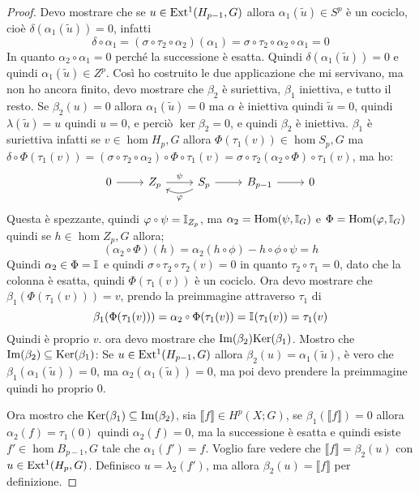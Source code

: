 \begin{proof}
  Devo mostrare che se $ u \in \mathrm{Ext^1}( H_{p-1},G) $ allora $ \alpha_1(\tilde{u}) \in S^p $
  è un cociclo, cioè $ \delta(\alpha_1(\tilde{u})) = 0 $, infatti
  \[
    \delta \circ \alpha_1 = (\sigma \circ \tau_2 \circ \alpha_2)(\alpha_1) = \sigma \circ \tau_2 \circ \alpha_2 \circ \alpha_1 = 0
  \]
  In quanto $ \alpha_2 \circ \alpha_1 = 0 $ perché la successione è esatta.
  Quindi $ \delta(\alpha_1(\tilde{u})) = 0 $ e quindi $ \alpha_1(\tilde{u}) \in Z^p $.
  Così ho costruito le due applicazione che mi servivano, ma non ho ancora
  finito, devo mostrare che $ \beta_2 $ è suriettiva, $ \beta_1 $ iniettiva, e tutto
  il resto.
  Se $ \beta_2(u) = 0 $ allora $ \alpha_1(\tilde{u}) = 0 $ ma $ \alpha $ è iniettiva quindi
  $ \tilde{u} = 0 $, quindi $ \lambda(\tilde{u}) = u $ quindi $ u = 0 $, e perciò
  $ \ker{\beta_2} = 0 $, e quindi $ \beta_2 $ è iniettiva.
  $ \beta_1 $ è suriettiva infatti se $ v \in \hom{H_p, G} $ allora $ \Phi(\tau_1(v)) \in \hom{S_p,G} $
  ma $ \delta \circ \Phi(\tau_1(v)) = (\sigma \circ \tau_2 \circ \alpha_2) \circ \Phi \circ \tau_1 (v) = \sigma \circ \tau_2 (\alpha_2 \circ \Phi) \circ \tau_1 (v) $,
  ma ho:
  \[
    \begin{tikzcd}
      0 \rar & Z_p \rar{\psi} & S_p \arrow[bend left]{l}{\phi} \rar & B_{p-1} \rar & 0
    \end{tikzcd}
  \]
  Questa è spezzante, quindi $ \phi \circ \psi = \Id{Z_p} $, ma
  $ \alpha_2 = \mathrm{Hom}( \psi, \mathbb{I}_{G}) $ e $ \Phi = \mathrm{Hom}( \varphi, \mathbb{I}_{G}) $
  quindi se $ h \in \hom{Z_p, G} $ allora;
  \[
    (\alpha_2 \circ \Phi)(h) = \alpha_2(h \circ \phi) - h \circ \phi \circ \psi = h
  \]
  Quindi $ \alpha_2 \in \Phi = \mathbb{I}_{} $ e quindi $ \sigma \circ \tau_2 \circ \tau_2 (v) = 0 $ in quanto
  $ \tau_2 \circ \tau_1 = 0 $, dato che la colonna è esatta, quindi $ \Phi(\tau_1(v)) $ è un cociclo.
  Ora devo mostrare che $ \beta_1(\Phi(\tau_1(v))) = v $, prendo la preimmagine attraverso $ \tau_1 $
  di
  \[
    \beta_1(\Phi(\tau_1(v)))  = \alpha_2 \circ \Phi (\tau_1(v)) = \Id{}(\tau_1(v)) = \tau_1(v)
  \]
  Quindi è proprio $ v $.
  ora devo mostrare che $ \mathrm{Im}( \beta_2 ) \mathrm{Ker}( \beta_1) $.
  Mostro che $ \mathrm{Im}( \beta_2 ) \subseteq \mathrm{Ker}( \beta_1) $:
  Se $ u \in \mathrm{Ext^1}( H_{p-1},G) $ allora $ \beta_2(u) = \alpha_1(\tilde{u}) $, è vero che
  $ \beta_1(\alpha_1(\tilde{u})) = 0 $, ma $ \alpha_2 (\alpha_1(\tilde{u})) = 0 $, ma poi devo prendere
  la preimmagine quindi ho proprio $ 0 $.

  Ora mostro che $ \mathrm{Ker}( \beta_1) \subseteq \mathrm{Im}( \beta_2 ) $, sia $ \llbracket f \rrbracket \in H^p(X;G) $, se $ \beta_1(\llbracket f \rrbracket) = 0 $
  allora $ \alpha_2(f) = \tau_1(0) $ quindi $ \alpha_2(f) = 0 $, ma la successione è esatta e quindi
  esiste $ f' \in \hom{B_{p-1}, G} $ tale che $ \alpha_1(f') = f $. Voglio fare vedere che $ \llbracket f \rrbracket = \beta_2 (u) $
  con $ u \in \mathrm{Ext^1}( H_p, G) $. Definisco $ u = \lambda_2(f') $, ma allora $ \beta_2(u) = \llbracket f \rrbracket $ per definizione.


\end{proof}
